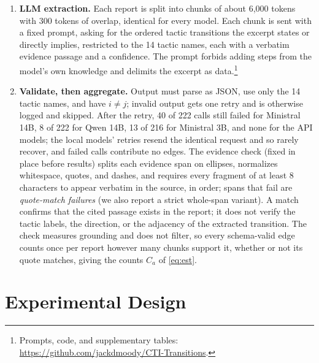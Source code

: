 \documentclass[letterpaper]{article} %
\begin{document}
\begin{enumerate}\setlength{\itemsep}{1pt}\setlength{\parskip}{0pt}
\item \textbf{LLM extraction.} Each report is split into chunks of about 6,000 tokens with 300 tokens of overlap, identical for every model. Each chunk is sent with a fixed prompt, asking for the ordered tactic transitions the excerpt states or directly implies, restricted to the 14 tactic names, each with a verbatim evidence passage and a confidence. The prompt forbids adding steps from the model's own knowledge and delimits the excerpt as data.\footnote{Prompts, code, and supplementary tables: \url{https://github.com/jackdmoody/CTI-Transitions}.}
\item \textbf{Validate, then aggregate.} Output must parse as JSON, use only the 14 tactic names, and have $i\neq j$; invalid output gets one retry and is otherwise logged and skipped. After the retry, 40 of 222 calls still failed for Ministral 14B, 8 of 222 for Qwen 14B, 13 of 216 for Ministral 3B, and none for the API models; the local models' retries resend the identical request and so rarely recover, and failed calls contribute no edges. The evidence check (fixed in place before results) splits each evidence span on ellipses, normalizes whitespace, quotes, and dashes, and requires every fragment of at least 8 characters to appear verbatim in the source, in order; spans that fail are \emph{quote-match failures} (we also report a strict whole-span variant). A match confirms that the cited passage exists in the report; it does not verify the tactic labels, the direction, or the adjacency of the extracted transition. The check measures grounding and does not filter, so every schema-valid edge counts once per report however many chunks support it, whether or not its quote matches, giving the counts $C_a$ of \eqref{eq:est}.
\end{enumerate}

\section{Experimental Design}
\end{document}
